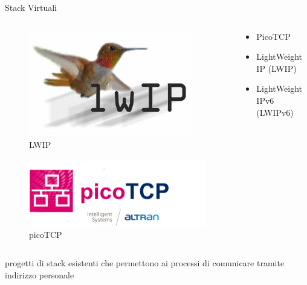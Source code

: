 \documentclass{beamer}
\begin{document}
\begin{frame}[fragile]{Stack Virtuali}


		\begin{columns}[T]
		\begin{column}{.40\textwidth}
			\begin{minipage}[c][0.6\textheight]{\linewidth}
		 \begin{figure}[t!]
		    \includegraphics[scale=0.2]{img/lwip}
			    \caption{LWIP}
			\end{figure}
				\begin{figure}[t!]
		    \includegraphics[scale=0.2]{img/picoTCP.png}
		    \caption{picoTCP}
			\end{figure}
\end{minipage}
		    \centering

		\end{column}
		\hfill%
		\begin{column}{.60\textwidth}
		\newline
		\begin{itemize}
		    \item PicoTCP\newline
				\item LightWeight IP (LWIP)\newline
				\item LightWeight IPv6 (LWIPv6)\newline

		\end{itemize}

		\end{column}%
		\end{columns}
		\vspace{1em}

		progetti di stack esistenti che permettono ai processi di comunicare tramite indirizzo personale

\end{frame}
\end{document}
